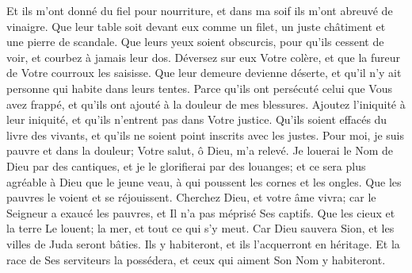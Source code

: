 {\VERSE Et ils m'ont donné du fiel pour nourriture, et dans ma soif ils m'ont abreuvé de vinaigre. \EVERSE
\VERSE Que leur table soit devant eux comme un filet, un juste châtiment et une pierre de scandale. \EVERSE
\VERSE Que leurs yeux soient obscurcis, pour qu'ils cessent de voir, et courbez à jamais leur dos. \EVERSE
\VERSE Déversez sur eux Votre colère, et que la fureur de Votre courroux les saisisse. \EVERSE
\VERSE Que leur demeure devienne déserte, et qu'il n'y ait personne qui habite dans leurs tentes. \EVERSE
\VERSE Parce qu'ils ont persécuté celui que Vous avez frappé, et qu'ils ont ajouté à la douleur de mes blessures. \EVERSE
\VERSE Ajoutez l'iniquité à leur iniquité, et qu'ils n'entrent pas dans Votre justice. \EVERSE
\VERSE Qu'ils soient effacés du livre des vivants, et qu'ils ne soient point inscrits avec les justes. \EVERSE
\VERSE Pour moi, je suis pauvre et dans la douleur; Votre salut, ô Dieu, m'a relevé. \EVERSE
\VERSE Je louerai le Nom de Dieu par des cantiques, et je le glorifierai par des louanges; \EVERSE
\VERSE et ce sera plus agréable à Dieu que le jeune veau, à qui poussent les cornes et les ongles. \EVERSE
\VERSE Que les pauvres le voient et se réjouissent. Cherchez Dieu, et votre âme vivra; \EVERSE
\VERSE car le Seigneur a exaucé les pauvres, et Il n'a pas méprisé Ses captifs. \EVERSE
\VERSE Que les cieux et la terre Le louent; la mer, et tout ce qui s'y meut. \EVERSE
\VERSE Car Dieu sauvera Sion, et les villes de Juda seront bâties. Ils y habiteront, et ils l'acquerront en héritage. \EVERSE
\VERSE Et la race de Ses serviteurs la possédera, et ceux qui aiment Son Nom y habiteront.

}
\newcommand{\psalmlxixfr}{
\VERSE Pour la fin, psaume de David, en souvenir de ce que Dieu l'avait sauvé. \EVERSE
\VERSE O Dieu, venez à mon aide; Seigneur, hâtez-Vous de me secourir. \EVERSE
\VERSE Qu'ils soient confondus et couverts de honte, ceux qui cherchent à m'ôter la vie. \EVERSE
\VERSE Qu'ils reculent en arrière et soient dans la confusion, ceux qui me veulent du mal. Qu'ils reculent aussitôt, rougissant de honte, ceux qui me disent: Va! va! \EVERSE
\VERSE Mais que tous ceux qui Vous cherchent tressaillent d'allégresse et de joie; et que ceux qui aiment Votre salut disent sans cesse: Que le Seigneur soit glorifié! \EVERSE
\VERSE Pour moi, je suis pauvre et indigent; ô Dieu, aidez-moi. Vous êtes mon aide et mon libérateur. Seigneur, ne tardez pas.

}
